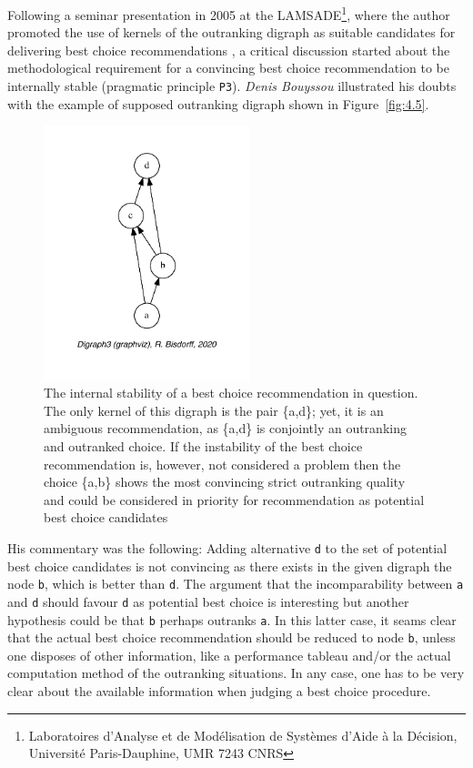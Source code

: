 Following a seminar presentation in 2005 at the LAMSADE\footnote{Laboratoires d'Analyse et de Modélisation de Systèmes d'Aide à la Décision, Université Paris-Dauphine, UMR 7243 CNRS}, where the author promoted the use of kernels of the outranking digraph as suitable candidates for delivering best choice recommendations \citep{BIS-2005}, a critical discussion started about the methodological requirement for a convincing best choice recommendation to be internally stable (pragmatic principle \texttt{P3}). \emph{Denis Bouyssou} illustrated his doubts with the example of supposed outranking digraph shown in Figure~\vref{fig:4.5}.
\begin{figure}[ht]
\sidecaption[t]
\includegraphics[width=6cm]{Figures/4-5-bouyssou11Oct05crisp.pdf}
\caption{The internal stability of a best choice recommendation in question. The only kernel of this digraph is the pair \{a,d\}; yet, it is an ambiguous recommendation, as \{a,d\} is conjointly an outranking and outranked choice. If the instability of the best choice recommendation is, however, not considered a problem then the choice \{a,b\} shows the most convincing strict outranking quality and could be considered in priority for recommendation as potential best choice candidates}
\label{fig:4.5}       %
\end{figure}

His commentary was the following: Adding alternative \texttt{d} to the set of potential best choice candidates is not convincing as there exists in the given digraph the node \texttt{b}, which is better than \texttt{d}. The argument that the incomparability between \texttt{a} and \texttt{d} should favour \texttt{d} as potential best choice is interesting but another hypothesis could be that \texttt{b} perhaps outranks \texttt{a}. In this latter case, it seams clear that the actual best choice recommendation should be reduced to node \texttt{b}, unless one disposes of other information, like a performance tableau and/or the actual computation method of the outranking situations. In any case, one has to be very clear about the available information when judging a best choice procedure.

